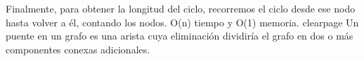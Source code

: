 {}Finalmente, para obtener la longitud del ciclo, recorremos el ciclo desde ese nodo hasta volver a él, contando los nodos.\markdownRendererHardLineBreak
{}\markdownRendererDollarSign{}O(n)\markdownRendererDollarSign{} tiempo y \markdownRendererDollarSign{}O(1)\markdownRendererDollarSign{} memoria.\markdownRendererInterblockSeparator
{}\markdownRendererInterblockSeparator
{}\markdownRendererDollarSign{}\markdownRendererBackslash{}clearpage\markdownRendererDollarSign{}\markdownRendererInterblockSeparator
{}
\markdownRendererSectionEnd \markdownRendererSectionBegin
{}\markdownRendererInterblockSeparator
{}Un puente en un grafo es una arista cuya eliminación dividiría el grafo en dos o más componentes conexas adicionales.\markdownRendererInterblockSeparator
{}
\markdownRendererSectionEnd 
\markdownRendererSectionEnd 
\markdownRendererSectionEnd \markdownRendererDocumentEnd